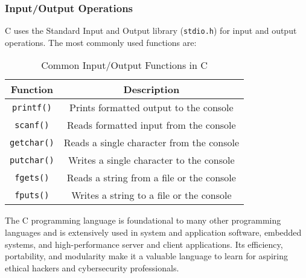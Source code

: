 \subsubsection{Input/Output Operations}
C uses the Standard Input and Output library (\texttt{stdio.h}) for input and output operations. The most commonly used functions are:

\begin{table}[h!]
\centering
\begin{tabular}{|c|c|}
\hline
\textbf{Function} & \textbf{Description} \\
\hline
\texttt{printf()} & Prints formatted output to the console \\
\texttt{scanf()} & Reads formatted input from the console \\
\texttt{getchar()} & Reads a single character from the console \\
\texttt{putchar()} & Writes a single character to the console \\
\texttt{fgets()} & Reads a string from a file or the console \\
\texttt{fputs()} & Writes a string to a file or the console \\
\hline
\end{tabular}
\caption{Common Input/Output Functions in C}
\label{table:io_functions}
\end{table}

The C programming language is foundational to many other programming languages and is extensively used in system and application software, embedded systems, and high-performance server and client applications. Its efficiency, portability, and modularity make it a valuable language to learn for aspiring ethical hackers and cybersecurity professionals.
